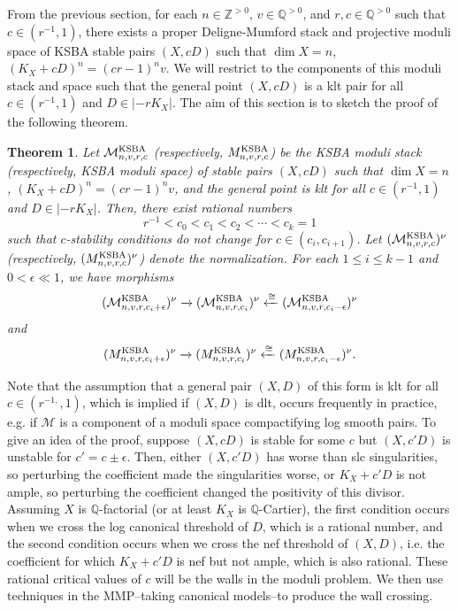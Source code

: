 \documentclass[11pt]{amsart}
\numberwithin{equation}{section}
\newtheorem{theorem}{Theorem}[section]
\theoremstyle{definition}
\newcommand{\bQ}{\mathbb{Q}}
\newcommand{\KSBA}{{\rm KSBA}}
\newcommand{\bZ}{\mathbb{Z}}
\newcommand{\cM}{\mathcal M}
\begin{document}
From the previous section, for each $n \in \bZ^{>0}$, $v \in \bQ^{>0}$, and $r, c \in \bQ^{>0}$ such that $c \in (r^{-1}, 1)$, there exists a proper Deligne-Mumford stack and projective moduli space of KSBA stable pairs $(X,cD)$ such that $\dim X = n$, $(K_X + cD)^n = (cr-1)^nv$.  We will restrict to the components of this moduli stack and space such that the general point $(X,cD)$ is a klt pair for all $c \in (r^{-1},1)$ and $D \in |-rK_X|$.  The aim of this section is to sketch the proof of the following theorem. 

\begin{theorem}
Let $\cM^{\KSBA}_{n,v,r,c}$ (respectively, $M^{\KSBA}_{n,v,r,c}$) be the KSBA moduli stack (respectively, KSBA moduli space) of stable pairs $(X,cD)$ such that $\dim X = n$, $(K_X+cD)^n = (cr-1)^nv$, and the general point is klt for all $c \in (r^{-1},1)$ and $D \in |-rK_X|$.  Then, there exist rational numbers \[r^{-1}<c_0<c_1<c_2<\cdots<c_k=1\] such that $c$-stability conditions do not change for $c\in (c_i,c_{i+1})$.  Let $(\cM^{\KSBA}_{n,v,r,c})^\nu$ (respectively, $(M^{\KSBA}_{n,v,r,c})^\nu$) denote the normalization.  For each $1\leq i\leq k-1$ and $0<\epsilon\ll 1$, we have morphisms
 \[
 (\cM^{\KSBA}_{n,v,r,c_i+\epsilon})^\nu\xrightarrow{}
 (\cM^{\KSBA}_{n,v,r,c_i})^\nu\xleftarrow{\cong}(\cM^{\KSBA}_{n,v,r,c_i-\epsilon})^\nu
 \]
and
 \[
 (M^{\KSBA}_{n,v,r,c_i+\epsilon})^\nu\xrightarrow{}
 (M^{\KSBA}_{n,v,r,c_i})^\nu\xleftarrow{\cong}(M^{\KSBA}_{n,v,r,c_i-\epsilon})^\nu.
 \]
\end{theorem}

Note that the assumption that a general pair $(X,D)$ of this form is klt for all $c \in (r^{-1,},1)$, which is implied if $(X,D)$ is dlt, occurs frequently in practice, e.g. if $\cM$ is a component of a moduli space compactifying log smooth pairs. To give an idea of the proof, suppose $(X,cD)$ is stable for some $c$ but $(X,c'D)$ is unstable for $c' = c\pm \epsilon$. Then, either $(X, c'D)$ has worse than slc singularities, so perturbing the coefficient made the singularities worse, or $K_X + c'D$ is not ample, so perturbing the coefficient changed the positivity of this divisor.  Assuming $X$ is $\bQ$-factorial (or at least $K_X$ is $\bQ$-Cartier), the first condition occurs when we cross the log canonical threshold of $D$, which is a rational number, and the second condition occurs when we cross the nef threshold of $(X,D)$, i.e. the coefficient for which $K_X + c'D$ is nef but not ample, which is also rational.  These rational critical values of $c$ will be the walls in the moduli problem.  We then use techniques in the MMP--taking canonical models--to produce the wall crossing.
\end{document}
